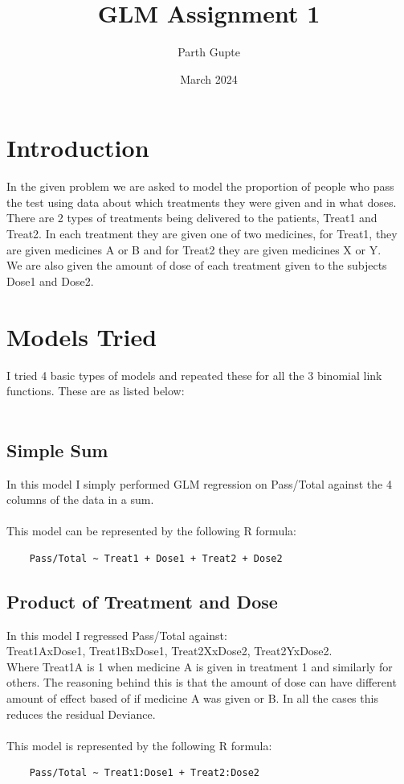 \documentclass{article}
\title{GLM Assignment 1}
\author{Parth Gupte}
\date{March 2024}
\begin{document}
\maketitle

\section{Introduction}
In the given problem we are asked to model the proportion of people who 
pass the test using data about which treatments they were given and in what doses.
There are 2 types of treatments being delivered to the patients, Treat1 and Treat2.
In each treatment they are given one of two medicines, for Treat1,
they are given medicines A or B and for Treat2 they are given medicines X or Y.\\
We are also given the amount of dose of each treatment given to 
the subjects Dose1 and Dose2.\\

\section{Models Tried}
I tried 4 basic types of models and repeated these for all the 3 binomial
link functions. These are as listed below:\\
\\
\subsection{Simple Sum}
In this model I simply performed GLM regression on 
Pass/Total against the 4 columns of the data in a sum.\\
\\
This model can be represented by the following R formula:\\
\begin{verbatim}
    Pass/Total ~ Treat1 + Dose1 + Treat2 + Dose2    
\end{verbatim}

\subsection{Product of Treatment and Dose}
In this model I regressed Pass/Total against:\\
Treat1AxDose1, Treat1BxDose1, Treat2XxDose2, Treat2YxDose2.\\
Where Treat1A is 1 when medicine A is given in treatment 1 and similarly for others.
The reasoning behind this is that the amount of dose can have different
amount of effect based of if medicine A was given or B.
In all the cases this reduces the residual Deviance.\\
\\
This model is represented by the following R formula:\\
\begin{verbatim}
    Pass/Total ~ Treat1:Dose1 + Treat2:Dose2
\end{verbatim}
\end{document}
